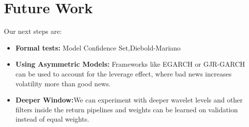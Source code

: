 \documentclass{article}
\begin{document}
\section{Future Work}
Our next steps are:
\begin{itemize}
\item\textbf{Formal tests:} Model Confidence Set,Diebold-Mariano
\item \textbf{Using Asymmetric Models:} Frameworks like EGARCH or GJR-GARCH can be used to account for the leverage effect, where bad news increases volatility more than good news.
\item\textbf{Deeper Window:}We can experiment with deeper wavelet levels and other filters inside the return pipelines and weights can be learned on validation instead of equal weights.
\end{itemize}



\end{document}
